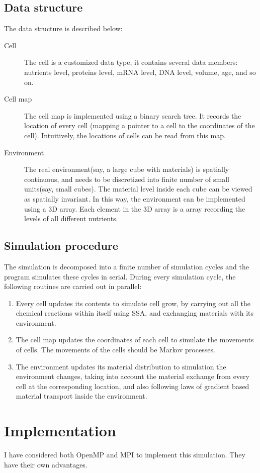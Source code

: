 \documentclass[12pt]{article}
\begin{document}
\subsection{Data structure}
The data structure is described below:
\begin{description}
  \item[Cell] The cell is a customized data type, it contains several data members: nutrients level, proteins level, mRNA level, DNA level, volume, age, and so on.
  \item[Cell map] The cell map is implemented using a binary search tree. It records the location of every cell (mapping a pointer to a cell to the coordinates of the cell). Intuitively, the locations of cells can be read from this map.
  \item[Environment] The real environment(say, a large cube with materials) is spatially continuous, and needs to be discretized into finite number of small units(say, small cubes). The material level inside each cube can be viewed as spatially invariant. In this way, the environment can be implemented using a 3D array. Each element in the 3D array is a array recording the levels of all different nutrients.
\end{description}

\subsection{Simulation procedure}
The simulation is decomposed into a finite number of simulation cycles and the program simulates these cycles in serial. During every simulation cycle, the following routines are carried out in parallel:
\begin{enumerate}
  \item Every cell updates its contents to simulate cell grow, by carrying out all the chemical reactions within itself using SSA, and exchanging materials with its environment.
  \item The cell map updates the coordinates of each cell to simulate the movements of cells. The movements of the cells should be Markov processes.
  \item The environment updates its material distribution to simulation the environment changes, taking into account the material exchange from every cell at the corresponding location, and also following laws of gradient based material transport inside the environment.
\end{enumerate}
\section{Implementation}
I have considered both OpenMP and MPI to implement this simulation. They have their own advantages.
\end{document}
